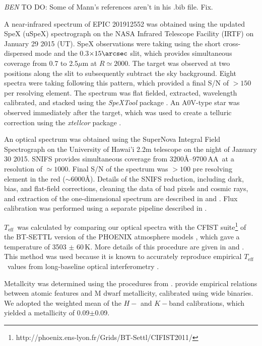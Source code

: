 \documentclass{emulateapj}
\newcommand\teff{\ensuremath{T_\text{eff}}}
\newcommand{\todo}[3]{{\color{#2} \emph{#1} TO DO: #3}}
\newcommand{\btmtodo}[1]{\todo{BEN}{red}{#1}}
\begin{document}
\btmtodo{Some of Mann's references aren't in his .bib file. Fix.}

A near-infrared spectrum of EPIC 201912552 was obtained using the updated SpeX 
(uSpeX) spectrograph \citep{Rayner03} on the NASA Infrared Telescope Facility 
(IRTF) on January 29 2015 (UT). 
SpeX observations were taking using the short cross-dispersed mode and the
0.3$\times15\arcsec$ slit, which provides simultaneous coverage from 0.7 
to 2.5$\mu$m at $R\simeq2000$. 
The target was observed at two positions along the slit to subsequently subtract 
the sky background. Eight spectra were taking following this pattern, which provided 
a final S/N of $>150$ per resolving element. 
The spectrum was flat fielded, extracted, wavelength calibrated, and stacked 
using the \textit{SpeXTool} package \citep{Cushing:2004}. 
An A0V-type star was observed immediately after 
the target, which was used to create a telluric correction using the 
\textit{xtellcor} package \citep{Vacca:2003}.

An optical spectrum was obtained using the SuperNova Integral Field Spectrograph
\citep[SNIFS,][]{2002SPIE.4836...61A,Lantz:2004} on the University of Hawai'i 
2.2m telescope on the night of January 30 2015. 
SNIFS provides simultaneous coverage from 3200\AA--9700\,AA\ at a resolution 
of $\simeq1000$. Final S/N of the spectrum was $>100$ pre resolving element 
in the red ($\sim6000$\AA). 
Details of the SNIFS reduction, including dark, bias, and flat-field corrections,
cleaning the data of bad pixels and cosmic rays, and extraction of the 
one-dimensional spectrum are  described in \citet{Bacon:2001} and 
\citet{Aldering:2006}. 
Flux calibration was performed using a separate pipeline described in \citet{Mann2015}. 

\teff\ was calculated by comparing our optical spectra with the CFIST
suite\footnote{http://phoenix.ens-lyon.fr/Grids/BT-Settl/CIFIST2011/} of the BT-SETTL
version of the PHOENIX atmosphere models \citep{Allard:2013}, which gave a temperature
of 3503 $\pm$ 60\,K. 
More details of this procedure are given in \citet{2013ApJ...779..188M} and
\citet{2014MNRAS.443.2561G}. 
This method was used because it is known to accurately reproduce empirical 
\teff\ values from long-baseline optical interferometry \citet{Boyajian2012}. 

Metallcity was determined using the procedures from \citet{Mann2013a}. 
\citet{Mann2013a} provide empirical relations between atomic features and M dwarf
metallicity, calibrated using wide binaries. 
We adopted the weighted mean of the $H-$ and $K-$band calibrations, 
which yielded a metallicity of 0.09$\pm$0.09.
\end{document}
